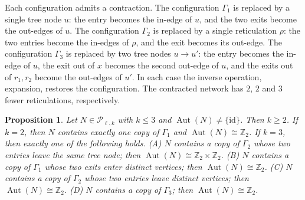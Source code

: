 \documentclass[11pt,a4paper]{article}
\newtheorem{proposition}[theorem]{Proposition}
\theoremstyle{definition}
\newcommand{\Aut}{\operatorname{Aut}}
\newcommand{\cP}{\mathcal{P}}
\begin{document}
Each configuration admits a contraction. The configuration $\Gamma_1$ is replaced by a single tree node $u$: the entry becomes the in-edge of $u$, and the two exits become the out-edges of $u$. The configuration $\Gamma_2$ is replaced by a single reticulation $\rho$: the two entries become the in-edges of $\rho$, and the exit becomes its out-edge. The configuration $\Gamma_3$ is replaced by two tree nodes $u\to u'$: the entry becomes the in-edge of $u$, the exit out of $x$ becomes the second out-edge of $u$, and the exits out of $r_1,r_2$ become the out-edges of $u'$. In each case the inverse operation, expansion, restores the configuration. The contracted network has $2$, $2$ and $3$ fewer reticulations, respectively.

\begin{proposition}\label{prop:class}
Let $N\in\cP_{\ell,k}$ with $k\le 3$ and $\Aut(N)\neq\{\mathrm{id}\}$. Then $k\ge 2$.
If $k=2$, then $N$ contains exactly one copy of $\Gamma_1$ and $\Aut(N)\cong\mathbb{Z}_2$.
If $k=3$, then exactly one of the following holds.
(A) $N$ contains a copy of $\Gamma_2$ whose two entries leave the same tree node; then $\Aut(N)\cong\mathbb{Z}_2\times\mathbb{Z}_2$.
(B) $N$ contains a copy of $\Gamma_1$ whose two exits enter distinct vertices; then $\Aut(N)\cong\mathbb{Z}_2$.
(C) $N$ contains a copy of $\Gamma_2$ whose two entries leave distinct vertices; then $\Aut(N)\cong\mathbb{Z}_2$.
(D) $N$ contains a copy of $\Gamma_3$; then $\Aut(N)\cong\mathbb{Z}_2$.
\end{proposition}
\end{document}
